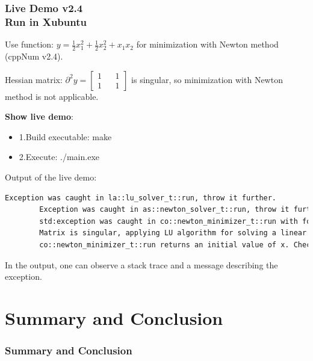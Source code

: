 \documentclass[ucs,10pt]{beamer}
\begin{document}
\begin{frame}[fragile]
\frametitle{Live Demo v2.4 \\
	\small \color{rwth-blue} Run in Xubuntu}
	Use function: $y=\frac{1}{2}x_1^2+\frac{1}{2}x_2^2+x_1 x_2$ for minimization with Newton method (cppNum v2.4).

	Hessian matrix: $\partial^2y=\begin{bmatrix}1&&1\\1&&1\end{bmatrix}$ is singular, so minimization with Newton method is not applicable.
	
	\textbf{Show live demo}:
	\begin{itemize}
        	\item 1.Build executable: make
        	\item 2.Execute: ./main.exe
	\end{itemize}
	Output of the live demo:
	\begin{lstlisting}[language=bash]
		Exception was caught in la::lu_solver_t::run, throw it further.
		Exception was caught in as::newton_solver_t::run, throw it further.
		std:exception was caught in co::newton_minimizer_t::run with following message:
		Matrix is singular, applying LU algorithm for solving a linear system is not possible.
		co::newton_minimizer_t::run returns an initial value of x. Check the correctness of the input.
	\end{lstlisting}
	In the output, one can observe a stack trace and a message describing the exception. 
\end{frame}



\section{Summary and Conclusion}

\begin{frame}
\frametitle{Summary and Conclusion}
\end{frame}
\end{document}
